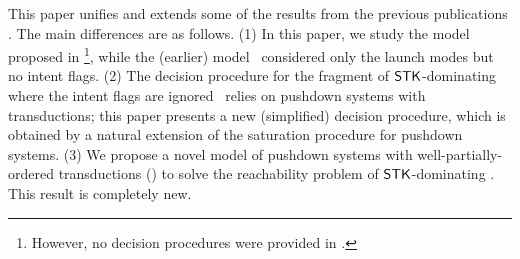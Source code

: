 This paper unifies and extends some of the results from the previous publications \cite{CHS+18,HC+19}.  The main differences are %
as follows. (1) In this paper, we study the {\AMASS} model proposed in \cite{HC+19}\footnote{However, no decision procedures were provided in \cite{HC+19}.}, while the (earlier) model~\cite{CHS+18} considered only the launch modes but no intent flags. (2) The decision procedure for the fragment of $\mathsf{STK}$-dominating {\AMASS} where the intent flags are ignored~\cite{CHS+18} relies on pushdown systems with transductions; this paper presents a new (simplified) decision procedure, which is obtained by a natural extension of the saturation procedure for pushdown systems. 
(3) We propose a novel model of pushdown systems with well-partially-ordered transductions (\WOTrPDS) %
to solve the reachability problem of $\mathsf{STK}$-dominating {\AMASS}. This result is completely new.  
